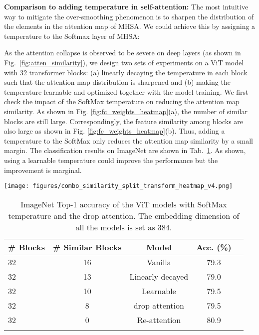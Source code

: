 \documentclass[10pt,twocolumn,letterpaper]{article}
\newcommand{\nameofatten}{Re-attention}
\newcommand{\myPara}[1]{\vspace{.05in}\noindent\textbf{#1}}
\begin{document}
\myPara{Comparison to adding temperature in self-attention:}
The most intuitive way to mitigate the over-smoothing phenomenon is to sharpen  the distribution of the elements in the attention map of MHSA. We could achieve this by assigning a   temperature   to the Softmax layer of MHSA:

As the attention collapse is observed to be severe on deep layers (as shown in Fig.~\ref{fig:atten_similarity}),
we design two sets of experiments on a ViT model with 32 transformer blocks: (a)   linearly decaying the temperature    in each block such that the attention map distribution is sharpened and (b) making the  temperature learnable and optimized together with the model training. We first check the impact of the SoftMax temperature on reducing the attention map similarity. As shown in Fig. \ref{fig:fc_weights_heatmap}(a), the number of similar blocks are still large. Correspondingly, the feature similarity among blocks are also large as shown in Fig. \ref{fig:fc_weights_heatmap}(b). Thus, adding a temperature to the SoftMax only reduces the attention map similarity by a small margin.   The classification results on ImageNet are shown in Tab.~\ref{tab:ablation_temperature}. As shown, using a learnable temperature could improve the performance but the improvement is marginal. 




\begin{figure*}[h]
\begin{center}
\texttt{[image: figures/combo\_similarity\_split\_transform\_heatmap\_v4.png]}
\end{center}
\vspace{-20pt}
  \caption{(a) Adjacent block attention map similarity with different methods. As can be seen, our proposed \nameofatten{} achieves low cross layer attention map similarity. 
  (b) Cosine similarity between the feature map of the last block and each of the previous block. 
  (c) Visualization of transformation matrix of the last block.}
\label{fig:fc_weights_heatmap}
\end{figure*}

\begin{table}[h]
\footnotesize
\caption{ImageNet Top-1 accuracy of the ViT models with  SoftMax temperature  and the drop attention. The embedding dimension of all the models is set as 384. }
\label{tab:ablation_temperature}
\centering
\begin{tabular}{lcccc}
\toprule
\bf \# Blocks
&\bf \# Similar Blocks
&\bf Model
&\bf Acc. (\%)
\\ \midrule 32 &  16  & Vanilla & 79.3 \\ 
32 &  13  & Linearly decayed  & 79.0  \\ 
32 &  10  & Learnable   & 79.5  \\ 
32 &  8  & drop attention & 79.5  \\ 
32 & 0   & \nameofatten{} & 80.9 \\
\bottomrule
\vspace{-5mm}
\end{tabular}
\end{table}
\end{document}
